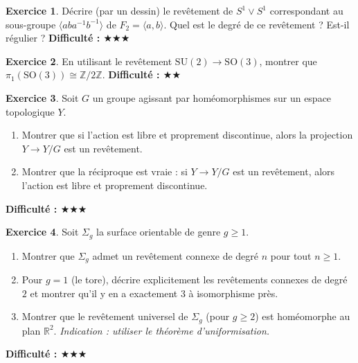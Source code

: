 \documentclass[12pt,a4paper,openany]{book}
\theoremstyle{definition}
\newtheorem{exercice}{Exercice}[chapter]
\theoremstyle{plain}
\theoremstyle{remark}
\newcommand{\Z}{\mathbb{Z}}
\newcommand{\R}{\mathbb{R}}
\begin{document}
\begin{exercice}\label{exo:rev-bouquet}
Décrire (par un dessin) le revêtement de $S^1 \vee S^1$ correspondant au sous-groupe
$\langle aba^{-1}b^{-1} \rangle$ de $F_2 = \langle a, b \rangle$. Quel est le degré de ce
revêtement ? Est-il régulier ?
\textbf{Difficulté : \(\bigstar\bigstar\bigstar\)}
\end{exercice}

\begin{exercice}\label{exo:pi1-so3}
En utilisant le revêtement $\mathrm{SU}(2) \to \mathrm{SO}(3)$, montrer que
$\pi_1(\mathrm{SO}(3)) \cong \Z/2\Z$.
\textbf{Difficulté : \(\bigstar\bigstar\)}
\end{exercice}

\begin{exercice}\label{exo:deck-action-propre}
Soit $G$ un groupe agissant par homéomorphismes sur un espace topologique $Y$.
\begin{enumerate}[label=(\alph*)]
\item Montrer que si l'action est libre et proprement discontinue, alors la projection
$Y \to Y/G$ est un revêtement.
\item Montrer que la réciproque est vraie : si $Y \to Y/G$ est un revêtement, alors l'action
est libre et proprement discontinue.
\end{enumerate}
\textbf{Difficulté : \(\bigstar\bigstar\bigstar\)}
\end{exercice}

\begin{exercice}\label{exo:rev-surface}
Soit $\Sigma_g$ la surface orientable de genre $g \geq 1$.
\begin{enumerate}[label=(\alph*)]
\item Montrer que $\Sigma_g$ admet un revêtement connexe de degré $n$ pour tout $n \geq 1$.
\item Pour $g = 1$ (le tore), décrire explicitement les revêtements connexes de degré $2$
et montrer qu'il y en a exactement $3$ à isomorphisme près.
\item Montrer que le revêtement universel de $\Sigma_g$ (pour $g \geq 2$) est homéomorphe
au plan $\R^2$. \emph{Indication : utiliser le théorème d'uniformisation.}
\end{enumerate}
\textbf{Difficulté : \(\bigstar\bigstar\bigstar\)}
\end{exercice}
\end{document}
